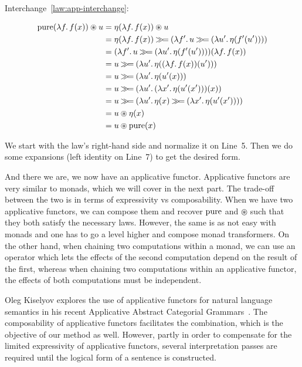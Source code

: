 Interchange~\eqref{law:app-interchange}:

\setcounter{TemporaryCounter}{\value{equation}}
\setcounter{equation}{0}
\NoChapterPrefix
\begin{align}
\pure(\lam{f}{f(x)}) \circledast u
&= \eta(\lam{f}{f(x)}) \circledast u \\
&= \eta(\lam{f}{f(x)}) \hsbind (\lam{f'}{u \hsbind (\lam{u'}{\eta(f'(u'))})}) \\
&= (\lam{f'}{u \hsbind (\lam{u'}{\eta(f'(u'))})})(\lam{f}{f(x)}) \\
&= u \hsbind (\lam{u'}{\eta((\lam{f}{f(x)})(u'))}) \\
&= u \hsbind (\lam{u'}{\eta(u'(x))}) \\
&= u \hsbind (\lam{u'}{(\lam{x'}{\eta(u'(x'))})(x)}) \\
&= u \hsbind (\lam{u'}{\eta(x) \hsbind (\lam{x'}{\eta(u'(x'))})}) \\
&= u \circledast \eta(x) \\
&= u \circledast \pure(x)
\end{align}
\setcounter{equation}{\value{TemporaryCounter}}
\ChapterPrefix

We start with the law's right-hand side and normalize it on Line~5. Then we
do some expansions (left identity on Line~7) to get the desired form.

And there we are, we now have an applicative functor. Applicative functors
are very similar to monads, which we will cover in the next part. The
trade-off between the two is in terms of expressivity vs
composability. When we have two applicative functors, we can compose them
and recover $\operatorname{pure}$ and $\circledast$ such that they both satisfy the
necessary laws. However, the same is as not easy with monads and one has to
go a level higher and compose monad transformers. On the other hand, when
chaining two computations within a monad, we can use an operator which lets
the effects of the second computation depend on the result of the first,
whereas when chaining two computations within an applicative functor, the
effects of both computations must be independent.

Oleg Kiselyov explores the use of applicative functors for natural language
semantics in his recent Applicative Abstract Categorial
Grammars~\cite{kiselyov2015applicative,kiselyov2015swing}. The
composability of applicative functors facilitates the combination, which is
the objective of our method as well. However, partly in order to compensate
for the limited expressivity of applicative functors, several
interpretation passes are required until the logical form of a sentence is
constructed.

